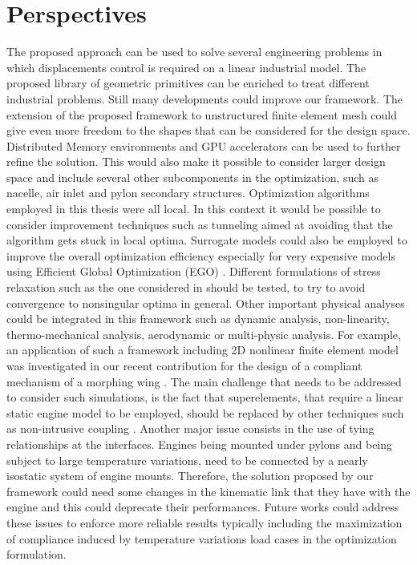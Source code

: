 \section{Perspectives}
The proposed approach can be used to solve several engineering problems in which displacements control is required on a linear industrial model. The proposed library of geometric primitives can be enriched to treat different industrial problems. Still many developments could improve our framework. 
The extension of the proposed framework to unstructured finite element mesh could give even more freedom to the shapes that can be considered for the design space.
Distributed Memory environments and GPU accelerators can be used to further refine the solution. This would also make it possible to consider larger design space and include several other subcomponents in the optimization, such as nacelle, air inlet and pylon secondary structures.
Optimization algorithms employed in this thesis were all local. In this context  it would be possible to consider improvement techniques such as tunneling \cite{zhang2018finding} aimed at avoiding that the algorithm gets stuck in local optima.
Surrogate models could also be employed to improve the overall optimization efficiency especially for very expensive models using Efficient Global Optimization (EGO) \cite{bouhlel2018efficient}.
Different formulations of stress relaxation such as the one considered in \cite{zhang2017stress} should be tested, to try to avoid convergence to nonsingular optima in general.
Other important physical analyses could be integrated in this framework such as dynamic analysis, non-linearity, thermo-mechanical analysis, aerodynamic or multi-physic analysis. For example, an application of such a framework including 2D nonlinear finite element model was investigated in our recent contribution for the design of a compliant mechanism of a morphing wing \cite{capasso2019optimisation}.
The main challenge that needs to be addressed to consider such simulations, is the fact that superelements, that require a linear static engine model to be employed, should be replaced by other techniques such as non-intrusive coupling \cite{Gendre2009}. Another major issue consists in the use of tying relationships at the interfaces. Engines being mounted under pylons and being subject to large temperature variations, need to be connected by a nearly isostatic system of engine mounts. Therefore, the solution proposed by our framework could need some changes in the kinematic link that they have with the engine and this could deprecate their performances. Future works could address these issues to enforce more reliable results typically including the maximization of compliance induced by temperature variations load cases in the optimization formulation. 
